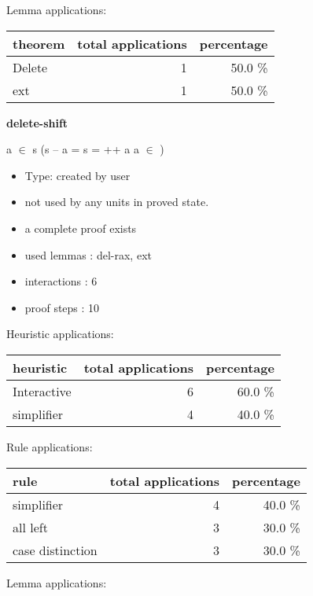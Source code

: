 \documentclass[a4paper]{article}
\begin{document}
Lemma applications:

\begin{supertabular}{l|r|r}
theorem	        & total applications & percentage \\ \hline
Delete & 1 & 50.0 \% \\
ext & 1 & 50.0 \% \\

\end{supertabular}
\pagebreak

{\LARGE\bf delete-shift}\label{lemma-delete-shift}

\medskip

 \Fol a $\in$ s \Imp (s -- a =  \Equiv s =  ++ a \And \Not a $\in$ )

\begin{itemize}

\item Type: created by user

\item not used by any units in proved state.
\item       a complete proof exists
\item       used lemmas  : del-rax, ext
\item       interactions : 6
\item       proof steps  : 10
\end{itemize}

\medskip


Heuristic applications:

\begin{supertabular}{l|r|r}
heuristic	& total applications & percentage \\ \hline
Interactive & 6 & 60.0 \% \\
simplifier & 4 & 40.0 \% \\

\end{supertabular}

Rule applications:

\begin{supertabular}{l|r|r}
rule	        & total applications & percentage \\ \hline
simplifier & 4 & 40.0 \% \\
all left & 3 & 30.0 \% \\
case distinction & 3 & 30.0 \% \\

\end{supertabular}

Lemma applications:
\end{document}
